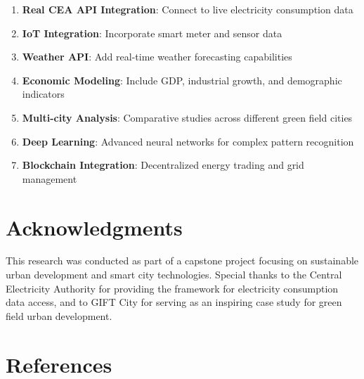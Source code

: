 \documentclass[12pt,a4paper]{article}
\begin{document}
\begin{enumerate}
    \item \textbf{Real CEA API Integration}: Connect to live electricity consumption data
    \item \textbf{IoT Integration}: Incorporate smart meter and sensor data
    \item \textbf{Weather API}: Add real-time weather forecasting capabilities
    \item \textbf{Economic Modeling}: Include GDP, industrial growth, and demographic indicators
    \item \textbf{Multi-city Analysis}: Comparative studies across different green field cities
    \item \textbf{Deep Learning}: Advanced neural networks for complex pattern recognition
    \item \textbf{Blockchain Integration}: Decentralized energy trading and grid management
\end{enumerate}

\section{Acknowledgments}
This research was conducted as part of a capstone project focusing on sustainable urban development and smart city technologies. Special thanks to the Central Electricity Authority for providing the framework for electricity consumption data access, and to GIFT City for serving as an inspiring case study for green field urban development.

\section{References}
\end{document}
